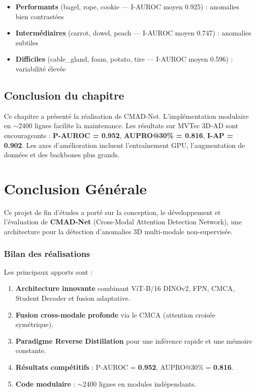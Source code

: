\documentclass[12pt,a4paper,oneside]{report}
\begin{document}
\begin{itemize}
    \item \textbf{Performants} (bagel, rope, cookie --- I-AUROC moyen 0.925) : anomalies bien contrastées
    \item \textbf{Intermédiaires} (carrot, dowel, peach --- I-AUROC moyen 0.747) : anomalies subtiles
    \item \textbf{Difficiles} (cable\_gland, foam, potato, tire --- I-AUROC moyen 0.596) : variabilité élevée
\end{itemize}

\section*{Conclusion du chapitre}

Ce chapitre a présenté la réalisation de CMAD-Net. L'implémentation modulaire en $\sim$2400 lignes facilite la maintenance. Les résultats sur MVTec 3D-AD sont encourageants : \textbf{P-AUROC = 0.952}, \textbf{AUPRO@30\% = 0.816}, \textbf{I-AP = 0.902}. Les axes d'amélioration incluent l'entraînement GPU, l'augmentation de données et des backbones plus grands.


\chapter*{Conclusion Générale}

Ce projet de fin d'études a porté sur la conception, le développement et l'évaluation de \textbf{CMAD-Net} (Cross-Modal Attention Detection Network), une architecture pour la détection d'anomalies 3D multi-modale non-supervisée.

\subsection*{Bilan des réalisations}

Les principaux apports sont :
\begin{enumerate}
    \item \textbf{Architecture innovante} combinant ViT-B/16 DINOv2, FPN, CMCA, Student Decoder et fusion adaptative.
    \item \textbf{Fusion cross-modale profonde} via le CMCA (attention croisée symétrique).
    \item \textbf{Paradigme Reverse Distillation} pour une inférence rapide et une mémoire constante.
    \item \textbf{Résultats compétitifs} : P-AUROC = \textbf{0.952}, AUPRO@30\% = \textbf{0.816}.
    \item \textbf{Code modulaire} : $\sim$2400 lignes en modules indépendants.
\end{enumerate}
\end{document}
